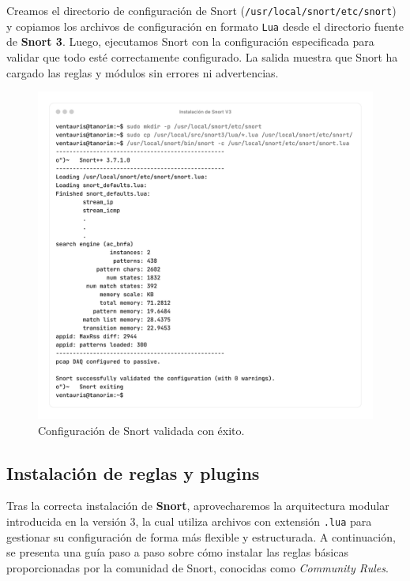 \documentclass[11pt,a4paper,twoside]{report}
\begin{document}
\newpage

Creamos el directorio de configuración de Snort (\texttt{/usr/local/snort/etc/snort}) y copiamos los archivos de configuración en formato \texttt{Lua} desde el directorio fuente de \textbf{Snort 3}. Luego, ejecutamos Snort con la configuración especificada para validar que todo esté correctamente configurado. La salida muestra que Snort ha cargado las reglas y módulos sin errores ni advertencias.

\begin{figure}[H]
	\centering
	\includegraphics[scale=0.12]{instalacion_snort/25-25.png}
	\caption{Configuración de Snort validada con éxito.}
\end{figure}

\newpage

\subsection{Instalación de reglas y plugins}
\vspace{-1.5em}

Tras la correcta instalación de \textbf{Snort}, aprovecharemos la arquitectura modular introducida en la versión 3, la cual utiliza archivos con extensión \texttt{.lua} para gestionar su configuración de forma más flexible y estructurada. A continuación, se presenta una guía paso a paso sobre cómo instalar las reglas básicas proporcionadas por la comunidad de Snort, conocidas como \textit{Community Rules}.
\end{document}
